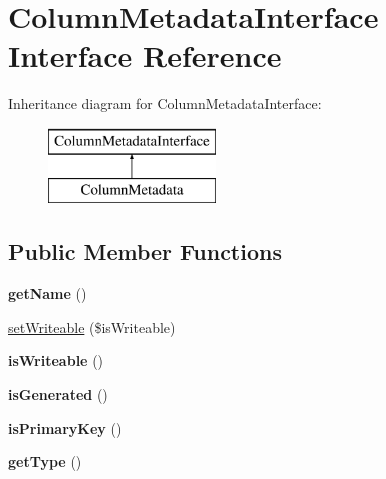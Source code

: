 \hypertarget{interface_pes_1_1_database_1_1_metadata_1_1_column_metadata_interface}{}\section{Column\+Metadata\+Interface Interface Reference}
\label{interface_pes_1_1_database_1_1_metadata_1_1_column_metadata_interface}
Inheritance diagram for Column\+Metadata\+Interface\+:\begin{figure}[H]
\begin{center}
\leavevmode
\includegraphics[height=2.000000cm]{interface_pes_1_1_database_1_1_metadata_1_1_column_metadata_interface}
\end{center}
\end{figure}
\subsection*{Public Member Functions}
\begin{DoxyCompactItemize}
\item 
\mbox{\label{interface_pes_1_1_database_1_1_metadata_1_1_column_metadata_interface_a3d0963e68bb313b163a73f2803c64600}} 
{\bfseries get\+Name} ()
\item 
\mbox{\hyperlink{interface_pes_1_1_database_1_1_metadata_1_1_column_metadata_interface_a0a0e7f080e4989bd257fa905bfb19c64}{set\+Writeable}} (\$is\+Writeable)
\item 
\mbox{\label{interface_pes_1_1_database_1_1_metadata_1_1_column_metadata_interface_ad2b043bb9d09928f905ee48f31d0cbb9}} 
{\bfseries is\+Writeable} ()
\item 
\mbox{\label{interface_pes_1_1_database_1_1_metadata_1_1_column_metadata_interface_a57f1c41ebec7aa84534f9d3e3bc9d10b}} 
{\bfseries is\+Generated} ()
\item 
\mbox{\label{interface_pes_1_1_database_1_1_metadata_1_1_column_metadata_interface_a84d622ec43bb17c0e2dad555eb2e727f}} 
{\bfseries is\+Primary\+Key} ()
\item 
\mbox{\label{interface_pes_1_1_database_1_1_metadata_1_1_column_metadata_interface_a830b5c75df72b32396701bc563fbe3c7}} 
{\bfseries get\+Type} ()
\end{DoxyCompactItemize}


